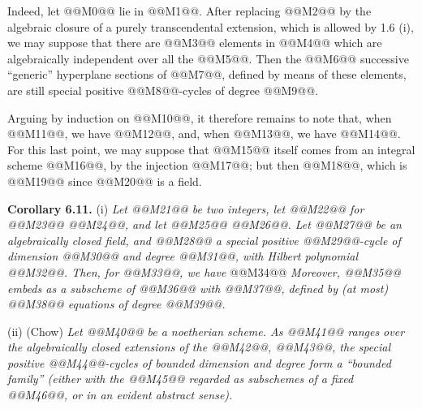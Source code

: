 Indeed, let @@M0@@ lie in @@M1@@. After replacing @@M2@@ by the algebraic closure of a purely transcendental extension, which is allowed by 1.6 (i), we may suppose that there are @@M3@@ elements in @@M4@@ which are algebraically independent over all the @@M5@@. Then the @@M6@@ successive ``generic'' hyperplane sections of @@M7@@, defined by means of these elements, are still special positive @@M8@@-cycles of degree @@M9@@.

Arguing by induction on @@M10@@, it therefore remains to note that, when @@M11@@, we have @@M12@@, and, when @@M13@@, we have @@M14@@. For this last point, we may suppose that @@M15@@ itself comes from an integral scheme @@M16@@, by the injection @@M17@@; but then @@M18@@, which is @@M19@@ since @@M20@@ is a field.

\textbf{Corollary 6.11.} (i) \emph{Let @@M21@@ be two integers, let @@M22@@ for @@M23@@ @@M24@@, and let @@M25@@ @@M26@@. Let @@M27@@ be an algebraically closed field, and @@M28@@ a special positive @@M29@@-cycle of dimension @@M30@@ and degree @@M31@@, with Hilbert polynomial @@M32@@. Then, for @@M33@@, we have}
@@M34@@
\emph{Moreover, @@M35@@ embeds as a subscheme of @@M36@@ with @@M37@@, defined by (at most) @@M38@@ equations of degree @@M39@@.}

(ii) (Chow) \emph{Let @@M40@@ be a noetherian scheme. As @@M41@@ ranges over the algebraically closed extensions of the @@M42@@, @@M43@@, the special positive @@M44@@-cycles of bounded dimension and degree form a ``bounded family'' (either with the @@M45@@ regarded as subschemes of a fixed @@M46@@, or in an evident abstract sense).}

